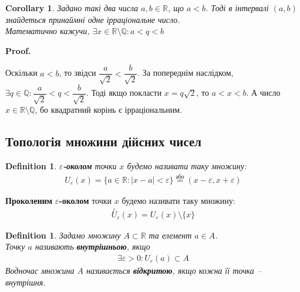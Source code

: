 \documentclass[a4paper, 14pt]{article}
\makeatletter
\def\qed{$\blacksquare$}
\theoremstyle{theoremdd}
\theoremstyle{theoremdd}
\newtheorem{definition}[theorem]{Definition}
\theoremstyle{theoremdd}
\theoremstyle{theoremdd}
\theoremstyle{theoremdd}
\theoremstyle{theoremdd}
\theoremstyle{theoremdd}
\theoremstyle{theoremdd}
\newtheorem{corollary}[theorem]{Corollary}
\renewenvironment{proof}[1][Proof.\\]{\par
\pushQED{\hfill \qed}%
\normalfont \topsep6\p@\@plus6\p@\relax
\trivlist
\item\relax
{\bfseries
#1\@addpunct{.}}\hspace\labelsep\ignorespaces
}{%
\popQED\endtrivlist\@endpefalse
}
\makeatother
\begin{document}
	\begin{corollary}
	Задано такі два числа $a,b \in \mathbb{R}$, що $a < b$. Тоді в інтервалі $(a,b)$ знайдеться принаймні одне ірраціональне число.\\
	Математично кажучи, $\exists x \in \mathbb{R} \setminus \mathbb{Q}: a < q < b$
	\end{corollary}
	
	\begin{proof}
	Оскільки $a < b$, то звідси $\dfrac{a}{\sqrt{2}} < \dfrac{b}{\sqrt{2}}$. За попереднім наслідком, $\exists q \in \mathbb{Q}: \dfrac{a}{\sqrt{2}} < q < \dfrac{b}{\sqrt{2}}$. Тоді якщо покласти $x = q \sqrt{2}$, то $a < x < b$. А число $x \in \mathbb{R} \setminus \mathbb{Q}$, бо квадратний корінь є ірраціональним.
	\end{proof}
	
	\subsection{Топологія множини дійсних чисел}
	\begin{definition}
	$\varepsilon$\textbf{-околом} точки $x$ будемо називати таку множину:
	\begin{align*}
	U_{\varepsilon}(x) = \{a \in \mathbb{R}: |x-a| < \varepsilon \} \overset{\text{або}}{=} (x-\varepsilon,x+\varepsilon)
	\end{align*}
	\end{definition}
	
	\begin{figure}[H]
	\centering
	\end{figure}
	\textbf{Проколеним} $\varepsilon$\textbf{-околом} точки $x$ будемо називати таку множину:
	\begin{align*}
	\overset{\circ}{U}_{\varepsilon}(x) = U_{\varepsilon}(x) \setminus \{x\}
	\end{align*}
\begin{definition}
Задамо множину $A \subset \mathbb{R}$ та елемент $a \in A$.\\
Точку $a$ називають \textbf{внутрішньою}, якщо
\begin{align*}
\exists \varepsilon > 0: U_{\varepsilon}(a) \subset A
\end{align*}
Водночас множина $A$ називається \textbf{відкритою}, якщо кожна її точка -- внутрішня.
\end{definition}
\end{document}
